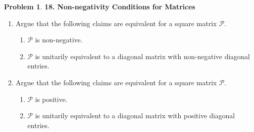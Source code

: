 \documentclass{article}
\theoremstyle{definition}
\newtheorem*{prob*}{Problem}
\begin{document}
\newpage




\begin{prob*}\textbf{18. Non-negativity Conditions for Matrices}
	\begin{enumerate}
		\item Argue that the following claims are equivalent for a square matrix $\mathcal{P}$.
		\begin{enumerate}
			\item $\mathcal{P}$ is non-negative.
			\item $\mathcal{P}$ is unitarily equivalent to a diagonal matrix with non-negative diagonal entries.
		\end{enumerate}
	
	
		\item Argue that the following claims are equivalent for a square matrix $\mathcal{P}$.
		\begin{enumerate}
			\item $\mathcal{P}$ is positive.
			\item $\mathcal{P}$ is unitarily equivalent to a diagonal matrix with positive diagonal entries. 
		\end{enumerate}
	\end{enumerate}
	
\end{prob*}


















\newpage
\end{document}
